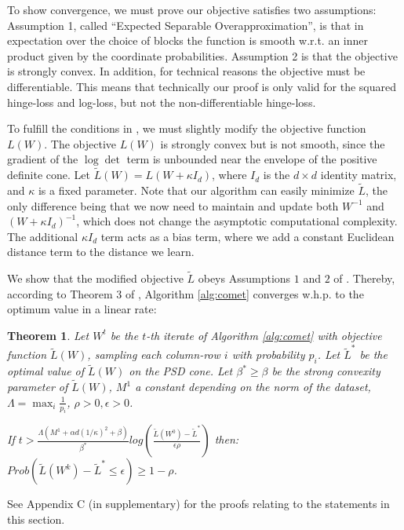 \documentclass{article} %
\newcommand\mat[1]{{#1}}
\newcommand{\W}{\mat{W}}
\newcommand{\tL}{\tilde{L}(\W)}
\newtheorem{theorem}{Theorem}
\begin{document}
To show convergence, we must prove our objective satisfies two assumptions: Assumption 1, called ``Expected Separable Overapproximation'', is that in expectation over the choice of blocks the function is smooth w.r.t. an inner product given by the coordinate probabilities. Assumption 2 is that the objective is strongly convex. In addition, for technical reasons the objective must be differentiable. This means that technically our proof is only valid for the squared hinge-loss and log-loss, but not the non-differentiable hinge-loss.

To fulfill the conditions in \cite{richtarik2013optimal}, we must slightly modify the objective function $L({\W})$. The objective $L(\W)$ is strongly convex but is not smooth, since the gradient of the $\log \det$ term is unbounded near the envelope of the positive definite cone. Let $\tilde{L}({\W}) = L({\W + \kappa I_d})$, where $I_d$ is the $d \times d$ identity matrix, and $\kappa$ is a fixed parameter.
Note that our algorithm can easily minimize $\tilde{L}$, the only difference being that we now need to maintain and update both $\W^{-1}$ and $(\W+\kappa I_d)^{-1}$, which does not change the asymptotic computational complexity. The additional $\kappa I_d$ term acts as a bias term, where we add a constant Euclidean distance term to the distance we learn. 

We show that the modified objective $\tilde{L}$ obeys Assumptions $1$ and $2$ of \citet{richtarik2013optimal}. Thereby, according to Theorem 3 of \citeauthor{richtarik2013optimal}, Algorithm \ref{alg:comet} converges w.h.p. to the optimum value in a linear rate:

\begin{theorem}
Let $\W^t$ be the $t$-th iterate of Algorithm \ref{alg:comet} with objective function $\tL$, sampling each column-row $i$ with probability $p_i$. Let $\tilde{L}^*$ be the optimal value of $\tL$ on the PSD cone. Let $\beta^* \geq \beta$ be the strong convexity parameter of $\tL$, $M^1$ a constant depending on the norm of the dataset, $\Lambda = \max_i \frac{1}{p_i}$, $\rho >0, \epsilon>0$.

If $t > \frac{\Lambda (M^1 + \alpha d (1/\kappa)^2 + \beta)}{\beta^*} log \left( \frac{\tilde{L}(W^0) - \tilde{L}^*}{\epsilon \rho}\right)$ then: $Prob(\tilde{L}(\W^k) - \tilde{L}^* \leq \epsilon) \geq 1-\rho$.
\end{theorem}
See Appendix C (in supplementary) for the proofs relating to the statements in this section.
\end{document}
